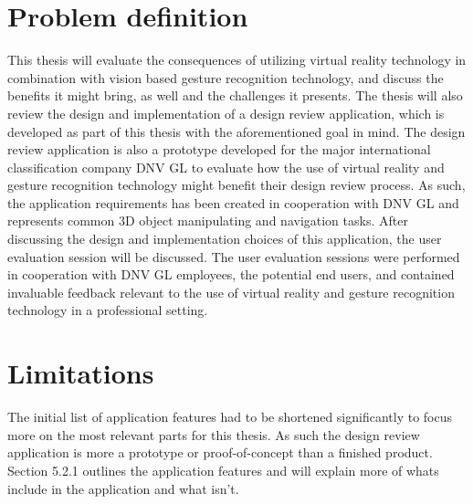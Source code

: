 \section{Problem definition}
This thesis will evaluate the consequences of utilizing virtual reality technology in combination with vision based gesture recognition technology, and discuss the benefits it 
might bring, as well and the challenges it presents. 
The thesis will also review the design and implementation of a design review application, which is developed as part of this thesis with the aforementioned goal in mind. 
The design review application is also a prototype developed for the major international classification company DNV GL to evaluate how the use of virtual reality and gesture
recognition technology might benefit their design review process. As such, the application requirements has been created in cooperation with DNV GL and represents
common 3D object manipulating and navigation tasks. After discussing the design and implementation choices of this application, the user evaluation session will be discussed. 
The user evaluation sessions were performed in cooperation with DNV GL employees, the potential end users, and contained invaluable feedback relevant to the use of virtual reality and gesture
recognition technology in a professional setting. 


\section{Limitations}
The initial list of application features had to be shortened significantly to focus more on the most relevant parts for this thesis. As such the design review application
is more a prototype or proof-of-concept than a finished product. Section 5.2.1 outlines the application features and will explain more of whats include in the application and what isn't. 

